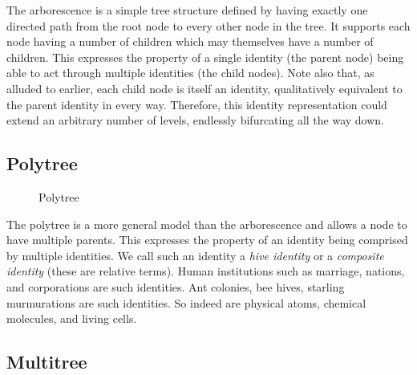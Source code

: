 \documentclass[pra,twocolumn,groupedaddress,10pt]{revtex4}
\theoremstyle{definition}
\begin{document}
The arborescence\cite{arborescence} is a simple tree structure defined by having exactly one directed path from the root node to every other node in the tree. It supports each node having a number of children which may themselves have a number of children. This expresses the property of a single identity (the parent node) being able to act through multiple identities (the child nodes). Note also that, as alluded to earlier, each child node is itself an identity, qualitatively equivalent to the parent identity in every way. Therefore, this identity representation could extend an arbitrary number of levels, endlessly bifurcating all the way down.

\subsection{Polytree} \label{sec:polytree}

\begin{figure}[htp]
\centering
{}
\caption{\label{fig:polytree}Polytree}
\end{figure}

The polytree\cite{polytree} is a more general model than the arborescence and allows a node to have multiple parents. This expresses the property of an identity being comprised by multiple identities. We call such an identity a \textit{hive identity} or a \textit{composite identity} (these are relative terms). Human institutions such as marriage, nations, and corporations are such identities. Ant colonies, bee hives, starling murmurations are such identities. So indeed are physical atoms, chemical molecules, and living cells.

\subsection{Multitree} \label{sec:multitree}
\end{document}
